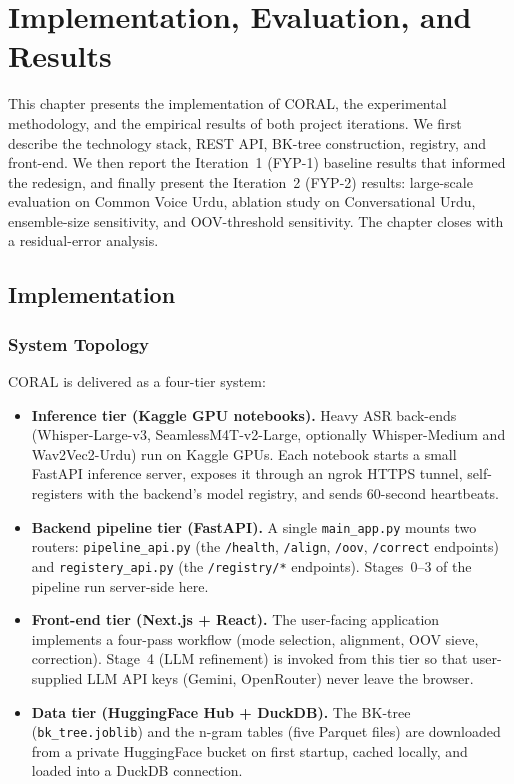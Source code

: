 \chapter{Implementation, Evaluation, and Results}
\label{chap:implementation}

This chapter presents the implementation of CORAL, the experimental methodology, and the empirical results of both project iterations. We first describe the technology stack, REST API, BK-tree construction, registry, and front-end. We then report the Iteration~1 (FYP-1) baseline results that informed the redesign, and finally present the Iteration~2 (FYP-2) results: large-scale evaluation on Common Voice Urdu, ablation study on Conversational Urdu, ensemble-size sensitivity, and OOV-threshold sensitivity. The chapter closes with a residual-error analysis.

\section{Implementation}
\label{sec:implementation}

\subsection{System Topology}
\label{ssec:topology}

CORAL is delivered as a four-tier system:

\begin{itemize}
  \item \textbf{Inference tier (Kaggle GPU notebooks).} Heavy ASR back-ends (Whisper-Large-v3, SeamlessM4T-v2-Large, optionally Whisper-Medium and Wav2Vec2-Urdu) run on Kaggle GPUs. Each notebook starts a small FastAPI inference server, exposes it through an ngrok HTTPS tunnel, self-registers with the backend's model registry, and sends 60-second heartbeats.
  \item \textbf{Backend pipeline tier (FastAPI).} A single \texttt{main\_app.py} mounts two routers: \texttt{pipeline\_api.py} (the \texttt{/health}, \texttt{/align}, \texttt{/oov}, \texttt{/correct} endpoints) and \texttt{registery\_api.py} (the \texttt{/registry/*} endpoints). Stages~0--3 of the pipeline run server-side here.
  \item \textbf{Front-end tier (Next.js + React).} The user-facing application implements a four-pass workflow (mode selection, alignment, OOV sieve, correction). Stage~4 (LLM refinement) is invoked from this tier so that user-supplied LLM API keys (Gemini, OpenRouter) never leave the browser.
  \item \textbf{Data tier (HuggingFace Hub + DuckDB).} The BK-tree (\texttt{bk\_tree.joblib}) and the n-gram tables (five Parquet files) are downloaded from a private HuggingFace bucket on first startup, cached locally, and loaded into a DuckDB connection.
\end{itemize}

